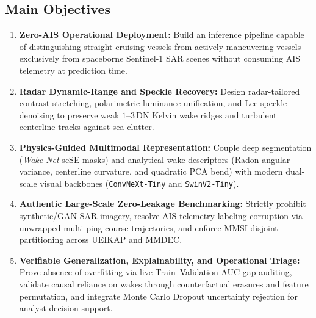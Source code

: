 \documentclass[11pt,a4paper]{article}
\begin{document}
\subsection{Main Objectives}
\begin{enumerate}[label=\roman*),leftmargin=2em]
    \item \textbf{Zero-AIS Operational Deployment:} Build an inference pipeline capable of distinguishing straight cruising vessels from actively maneuvering vessels exclusively from spaceborne Sentinel-1 SAR scenes without consuming AIS telemetry at prediction time.
    \item \textbf{Radar Dynamic-Range and Speckle Recovery:} Design radar-tailored contrast stretching, polarimetric luminance unification, and Lee speckle denoising to preserve weak $1$--$3$\,DN Kelvin wake ridges and turbulent centerline tracks against sea clutter.
    \item \textbf{Physics-Guided Multimodal Representation:} Couple deep segmentation (\textit{Wake-Net} scSE masks) and analytical wake descriptors (Radon angular variance, centerline curvature, and quadratic PCA bend) with modern dual-scale visual backbones (\texttt{ConvNeXt-Tiny} and \texttt{SwinV2-Tiny}).
    \item \textbf{Authentic Large-Scale Zero-Leakage Benchmarking:} Strictly prohibit synthetic/GAN SAR imagery, resolve AIS telemetry labeling corruption via unwrapped multi-ping course trajectories, and enforce MMSI-disjoint partitioning across UEIKAP and MMDEC.
    \item \textbf{Verifiable Generalization, Explainability, and Operational Triage:} Prove absence of overfitting via live Train--Validation AUC gap auditing, validate causal reliance on wakes through counterfactual erasures and feature permutation, and integrate Monte Carlo Dropout uncertainty rejection for analyst decision support.
\end{enumerate}
\end{document}
